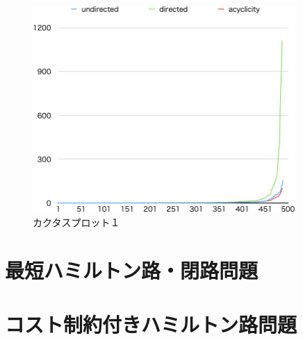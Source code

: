 \begin{figure}[htbp]
\begin{center}
  \includegraphics[width=10cm]{fig/cactus.png}
\caption{カクタスプロット１}
\label{cactus}
\end{center}
\end{figure}

\section{最短ハミルトン路・閉路問題}


\section{コスト制約付きハミルトン路問題}


